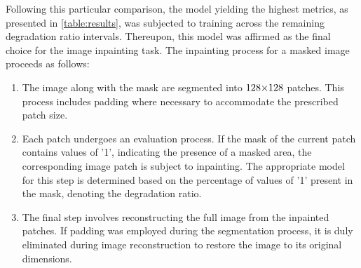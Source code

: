 \begin{table}[ht]
    \centering
    \caption[Test metrics for $(25, 30)$ degradation ratio interval]{Test metrics for (25, 30) degradation ratio interval\\(freeform mask generation)}
    \label{table:results}
\end{table}

Following this particular comparison, the model yielding the highest metrics, as presented in \autoref{table:results}, was subjected to training across the remaining degradation ratio intervals. Thereupon, this model was affirmed as the final choice for the image inpainting task. The inpainting process for a masked image proceeds as follows:
\begin{enumerate}[leftmargin=1.5em]
    \setlength\itemsep{0.2cm}

    \item The image along with the mask are segmented into $128 {\times} 128$ patches. This process includes padding where necessary to accommodate the prescribed patch size.

    \item Each patch undergoes an evaluation process. If the mask of the current patch contains values of '1', indicating the presence of a masked area, the corresponding image patch is subject to inpainting. The appropriate model for this step is determined based on the percentage of values of '1' present in the mask, denoting the degradation ratio.

    \item The final step involves reconstructing the full image from the inpainted patches. If padding was employed during the segmentation process, it is duly eliminated during image reconstruction to restore the image to its original dimensions.
\end{enumerate}

